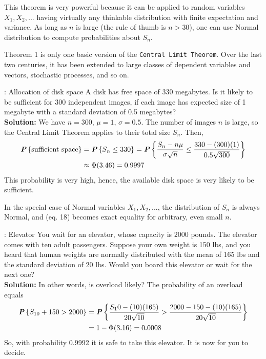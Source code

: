This theorem is very powerful because it can be applied to random variables $X_1, X_2, ...$ having virtually any thinkable distribution with finite expectation and variance. As long as $n$ is large (the rule of thumb is $n > 30$), one can use Normal distribution to compute probabilities about $S_n$.

Theorem 1 is only one basic version of the \texttt{Central Limit Theorem}. Over the last two centuries, it has been extended to large classes of dependent variables and vectors, stochastic processes, and so on.

\begin{example}{: Allocation of disk space}
    A disk has free space of 330 megabytes. Is it likely to be sufficient for 300 independent images, if each image has expected size of 1 megabyte with a standard deviation of 0.5 megabytes?\\

    \textbf{Solution:} We have $n = 300$, $\mu = 1$, $\sigma = 0.5$. The number of images $n$ is large, so the Central Limit Theorem applies to their total size $S_n$. Then,
    \begin{align*}
        \textbf{\textit{P}}\left\{\textnormal{sufficient space}\right\} &= \textbf{\textit{P}}\left\{S_n \leq 330\right\} = \textbf{\textit{P}}\left\{\frac{S_n - n\mu}{\sigma \sqrt{n}} \leq \frac{330-(300)(1)}{0.5\sqrt{300}}\right\}\\
        &\approx \Phi(3.46) = 0.9997
    \end{align*}
    This probability is very high, hence, the available disk space is very likely to be sufficient.
\end{example}

In the special case of Normal variables $X_1, X_2, ...$, the distribution of $S_n$ is always Normal, and (eq. 18) becomes exact equality for arbitrary, even small $n$.

\begin{example}{: Elevator}
    You wait for an elevator, whose capacity is 2000 pounds. The elevator comes with ten adult passengers. Suppose your own weight is 150 lbs, and you heard that human weights are normally distributed with the mean of 165 lbs and the standard deviation of 20 lbs. Would you board this elevator or wait for the next one?\\

    \textbf{Solution:}
    In other words, is overload likely? The probability of an overload equals 
    \begin{align*}
        \textbf{\textit{P}}\left\{S_{10} + 150 > 2000\right\} &= \textbf{\textit{P}}\left\{\frac{S_10-(10)(165)}{20\sqrt{10}} > \frac{2000-150-(10)(165)}{20\sqrt{10}}\right\}\\
        &= 1 - \Phi(3.16) = 0.0008
    \end{align*}
    So, with probability 0.9992 it is safe to take this elevator. It is now for you to decide.
\end{example}

